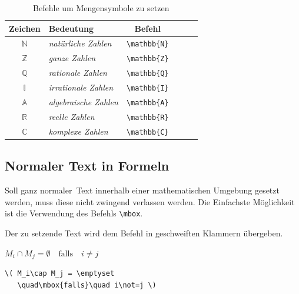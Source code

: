 \documentclass[a4paper,10pt,twoside]{scrbook}
\begin{document}
\begin{table}[h!tb]
\centering
\caption{Befehle um Mengensymbole zu setzen}
\label{Tabelle_Mengensymbole}       %
\begin{tabular}{clclcl}
\hline
Zeichen & Bedeutung & Befehl  \\
\hline
\(\mathbb{N}\) & \textsl{natürliche Zahlen}    & \texttt{\textbackslash mathbb\{N\}} \\
\(\mathbb{Z}\) & \textsl{ganze Zahlen}         & \texttt{\textbackslash mathbb\{Z\}} \\
\(\mathbb{Q}\) & \textsl{rationale Zahlen}     & \texttt{\textbackslash mathbb\{Q\}} \\
\(\mathbb{I}\) & \textsl{irrationale Zahlen}   & \texttt{\textbackslash mathbb\{I\}} \\
\(\mathbb{A}\) & \textsl{algebraische Zahlen}  & \texttt{\textbackslash mathbb\{A\}} \\
\(\mathbb{R}\) & \textsl{reelle Zahlen}        & \texttt{\textbackslash mathbb\{R\}} \\
\(\mathbb{C}\) & \textsl{komplexe Zahlen}      & \texttt{\textbackslash mathbb\{C\}} \\
\hline
\end{tabular}
\end{table}

\subsection{Normaler Text in Formeln}

Soll ganz \glqq normaler\grqq\ Text innerhalb einer
mathematischen Umgebung gesetzt werden, muss diese nicht zwingend verlassen werden.
Die Einfachste Möglichkeit ist die Verwendung des Befehls \verb!\mbox!.


Der zu setzende Text wird dem Befehl in geschweiften 
Klammern übergeben. 


\begin{minipage}[c]{.38\textwidth}
\setlength{\parskip}{1em}
\centering
\( M_i\cap M_j = \emptyset
   \quad\mbox{falls}\quad i\not=j \)
\end{minipage}
\hfill
\begin{minipage}[c]{.6\textwidth}
\setlength{\parskip}{1em}
\begin{lstlisting}[label=mboxbeispiel, style=customlatex]
\( M_i\cap M_j = \emptyset
   \quad\mbox{falls}\quad i\not=j \)
\end{lstlisting}
\end{minipage}
\end{document}
